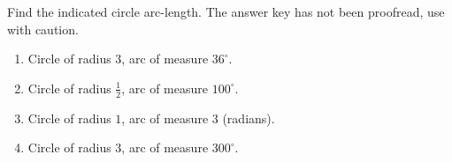 Find the indicated circle arc-length. The answer key has not been proofread, use with caution. 
\begin{enumerate}
\item Circle of radius $3$, arc of measure $36^\circ$.

\item Circle of radius $\frac{1}{2}$, arc of measure $100^\circ$.

\item Circle of radius $1$, arc of measure $3$ (radians).

\item Circle of radius $3$, arc of measure $300^\circ$.

\end{enumerate}